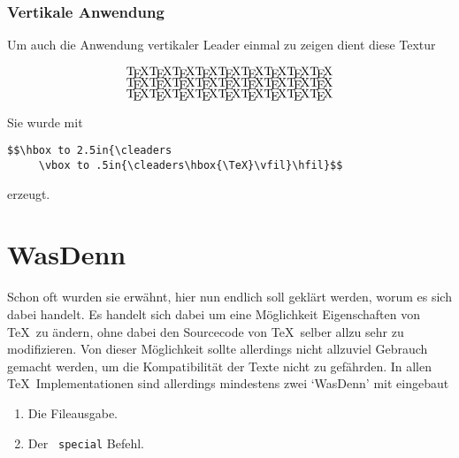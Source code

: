 \subsubsection{Vertikale Anwendung}
Um auch die Anwendung vertikaler Leader einmal zu zeigen dient diese
Textur
$$\hbox to 2.5in{\cleaders
     \vbox to .5in{\cleaders\hbox{\TeX}\vfil}\hfil}$$
Sie wurde mit
\begin{verbatim}
$$\hbox to 2.5in{\cleaders
     \vbox to .5in{\cleaders\hbox{\TeX}\vfil}\hfil}$$
\end{verbatim}
erzeugt.
\section{WasDenn}
Schon oft wurden sie erw\"ahnt, hier nun endlich soll gekl\"art werden,
worum es sich dabei handelt. Es handelt sich dabei um eine M\"oglichkeit
Eigenschaften von \TeX\ zu \"andern, ohne dabei den Sourcecode von \TeX\
selber allzu sehr zu modifizieren. Von dieser M\"oglichkeit sollte
allerdings nicht allzuviel Gebrauch gemacht werden, um die
Kompatibilit\"at der Texte nicht zu gef\"ahrden. In allen \TeX\
Implementationen sind allerdings mindestens zwei `WasDenn' mit
eingebaut\index{File!Ausgabe}
\begin{enumerate}
\item Die Fileausgabe.
\item Der {\tt{} special} Befehl.
\end{enumerate}
